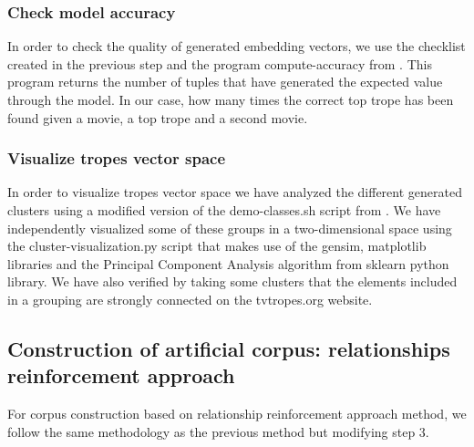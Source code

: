 \documentclass[letterpaper]{article}
\begin{document}
	\subsubsection{Check model accuracy}
	In order to check the quality of generated embedding vectors, we use the checklist created in the previous step and the program compute-accuracy from \cite{git-hub-word2vec}. This program returns the number of tuples that have generated the expected value through the model. In our case, how many times the correct top trope has been found given a movie, a top trope and a second movie.
	
	\subsubsection{Visualize tropes vector space}
	In order to visualize tropes vector space we have analyzed the different generated clusters using a modified version of the demo-classes.sh script from \cite{git-hub-word2vec}. 
	We have independently visualized some of these groups in a two-dimensional space using the cluster-visualization.py script that makes use of the gensim, matplotlib libraries and the Principal Component Analysis algorithm from sklearn python library. We have also verified by taking some clusters that the elements included in a grouping are strongly connected on the tvtropes.org website.
	
	\subsection{Construction of artificial corpus: relationships reinforcement approach}
	For corpus construction based on relationship reinforcement approach method, we follow the same methodology as the previous method but modifying step 3.
	
	
	
\end{document}
